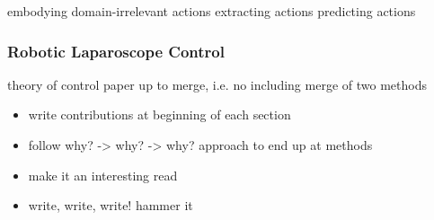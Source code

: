 embodying domain-irrelevant actions
extracting actions
predicting actions

\subsubsection{Robotic Laparoscope Control}
\label{in:sec:robotic_laparoscope_control}
theory of control paper up to merge, i.e. no including merge of two methods

\begin{itemize}
    \item write contributions at beginning of each section
    \item follow why? -> why? -> why? approach to end up at methods
    \item make it an interesting read
    \item write, write, write! hammer it
\end{itemize}







